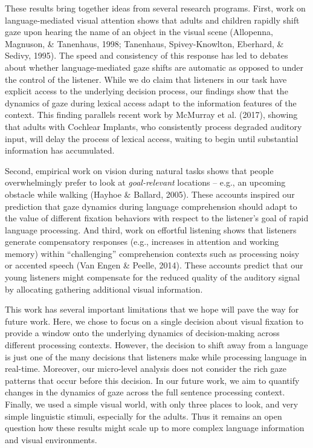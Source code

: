 \documentclass[10pt, letterpaper]{article}
\begin{document}
These results bring together ideas from several research programs.
First, work on language-mediated visual attention shows that adults and
children rapidly shift gaze upon hearing the name of an object in the
visual scene (Allopenna, Magnuson, \& Tanenhaus, 1998; Tanenhaus,
Spivey-Knowlton, Eberhard, \& Sedivy, 1995). The speed and consistency
of this response has led to debates about whether language-mediated gaze
shifts are automatic as opposed to under the control of the listener.
While we do claim that listeners in our task have explicit access to the
underlying decision process, our findings show that the dynamics of gaze
during lexical access adapt to the information features of the context.
This finding parallels recent work by McMurray et al. (2017), showing
that adults with Cochlear Implants, who consistently process degraded
auditory input, will delay the process of lexical access, waiting to
begin until substantial information has accumulated.

Second, empirical work on vision during natural tasks shows that people
overwhelmingly prefer to look at \emph{goal-relevant} locations -- e.g.,
an upcoming obstacle while walking (Hayhoe \& Ballard, 2005). These
accounts inspired our prediction that gaze dynamics during language
comprehension should adapt to the value of different fixation behaviors
with respect to the listener's goal of rapid language processing. And
third, work on effortful listening shows that listeners generate
compensatory responses (e.g., increases in attention and working memory)
within ``challenging'' comprehension contexts such as processing noisy
or accented speech (Van Engen \& Peelle, 2014). These accounts predict
that our young listeners might compensate for the reduced quality of the
auditory signal by allocating gathering additional visual information.

This work has several important limitations that we hope will pave the
way for future work. Here, we chose to focus on a single decision about
visual fixation to provide a window onto the underlying dynamics of
decision-making across different processing contexts. However, the
decision to shift away from a language is just one of the many decisions
that listeners make while processing language in real-time. Moreover,
our micro-level analysis does not consider the rich gaze patterns that
occur before this decision. In our future work, we aim to quantify
changes in the dynamics of gaze across the full sentence processing
context. Finally, we used a simple visual world, with only three places
to look, and very simple linguistic stimuli, especially for the adults.
Thus it remains an open question how these results might scale up to
more complex language information and visual environments.
\end{document}
